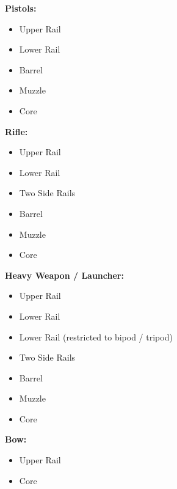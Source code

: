 \begin{multicols}{2}
\textbf{Pistols:}
\vspace{-8mm}
\begin{itemize}
	\setlength\itemsep{-8mm}
	\item Upper Rail
	\item Lower Rail
	\item Barrel
	\item Muzzle
	\item Core
\end{itemize}

\vspace{-5mm}
\textbf{Rifle:}
\vspace{-8mm}
\begin{itemize}
	\setlength\itemsep{-8mm}
	\item Upper Rail
	\item Lower Rail
	\item Two Side Rails
	\item Barrel
	\item Muzzle
	\item Core
\end{itemize}

\vspace{-5mm}
\textbf{Heavy Weapon / Launcher:}
\vspace{-8mm}
\begin{itemize}
	\setlength\itemsep{-8mm}
	\item Upper Rail
	\item Lower Rail
	\item Lower Rail (restricted to bipod / tripod)
	\item Two Side Rails
	\item Barrel
	\item Muzzle
	\item Core
\end{itemize}

\vspace{-5mm}
\textbf{Bow:}
\vspace{-8mm}
\begin{itemize}
	\setlength\itemsep{-8mm}
	\item Upper Rail
	\item Core
\end{itemize}
\end{multicols}

